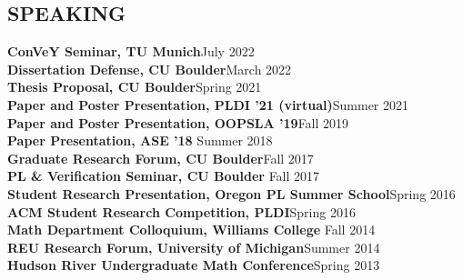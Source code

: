 \documentclass[margin]{res}
\begin{document}
\begin{resume}
\section{SPEAKING}
{\bf ConVeY Seminar, TU Munich}\hfill July 2022\\
{\bf Dissertation Defense, CU Boulder}\hfill March 2022\\
{\bf Thesis Proposal, CU Boulder}\hfill Spring 2021\\
{\bf Paper and Poster Presentation, PLDI '21 (virtual)}\hfill Summer 2021\\
{\bf Paper and Poster Presentation, OOPSLA '19}\hfill Fall 2019\\
{\bf Paper Presentation, ASE '18 }\hfill Summer 2018\\
{\bf Graduate Research Forum, CU Boulder}\hfill Fall 2017\\
{\bf PL \& Verification Seminar, CU Boulder }\hfill Fall 2017\\
{\bf Student Research Presentation, Oregon PL Summer School}\hfill Spring 2016\\
{\bf ACM Student Research Competition, PLDI}\hfill Spring 2016\\
{\bf Math Department Colloquium, Williams College} \hfill Fall 2014\\
{\bf REU Research Forum, University of Michigan}\hfill Summer 2014\\
{\bf Hudson River Undergraduate Math Conference}\hfill Spring 2013

\end{resume}
\end{document}
